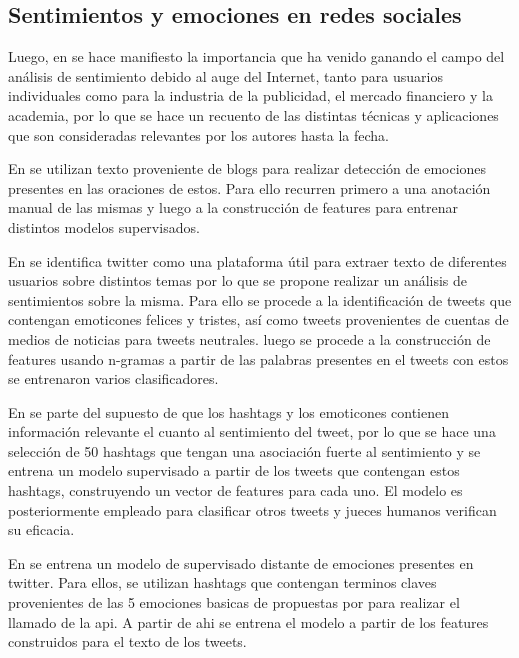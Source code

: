 \subsection{Sentimientos y emociones en redes sociales}



Luego, en \cite{pang2008opinion} se hace manifiesto la importancia que ha venido ganando el campo del análisis de sentimiento debido al auge del Internet, tanto para usuarios individuales como para la industria de la publicidad, el mercado financiero y la academia, por lo que se hace un recuento de las distintas técnicas y aplicaciones que son consideradas relevantes por los autores hasta la fecha.


En \cite{aman2007identifying} se utilizan texto proveniente de blogs para realizar detección de emociones presentes en las oraciones de estos. Para ello recurren primero a una anotación manual de las mismas y luego a la construcción de features para entrenar distintos modelos supervisados. 




En \cite{pak2010twitter} se identifica twitter como una plataforma útil para extraer texto de diferentes usuarios sobre distintos temas por lo que se propone realizar un análisis de sentimientos sobre la misma. Para ello se procede  a la identificación de tweets que contengan emoticones felices y tristes, así como tweets provenientes de cuentas de medios de noticias para tweets neutrales. luego se procede a la construcción de features usando n-gramas a partir de las palabras presentes en el tweets  con estos se entrenaron varios clasificadores.





En \cite{davidov2010enhanced} se parte del supuesto de que los hashtags y los emoticones contienen información relevante el cuanto al sentimiento del tweet, por lo que se hace una selección de 50 hashtags que tengan una asociación fuerte al sentimiento y se entrena un modelo supervisado a partir de los tweets que contengan estos hashtags, construyendo un vector de features para cada uno. El modelo es posteriormente empleado para clasificar otros tweets y jueces humanos verifican su eficacia.


En  \cite{wang2012harnessing} se entrena un modelo de supervisado distante de emociones presentes en twitter. Para ellos, se utilizan hashtags que contengan terminos claves provenientes de las 5 emociones basicas de propuestas por \cite{ekman1993facial} para realizar el llamado de la api. A partir de ahi se entrena el modelo a partir de los features construidos para el texto de los tweets. 


